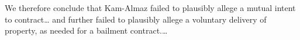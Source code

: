 We therefore conclude that Kam-Almaz failed to plausibly allege a mutual intent
to contract\ldots
and further failed to
plausibly allege a voluntary delivery of property, as needed for a bailment
contract.\ldots
%

